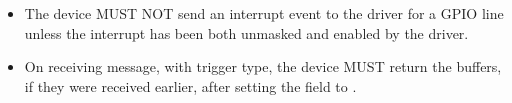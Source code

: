 
\begin{itemize}
\item The device MUST NOT send an interrupt event to the driver for a GPIO
    line unless the interrupt has been both unmasked and enabled by the
    driver.

\item On receiving  message, with
     trigger type, the device MUST return the
    buffers, if they were received earlier, after setting the 
    field to .
\end{itemize}
